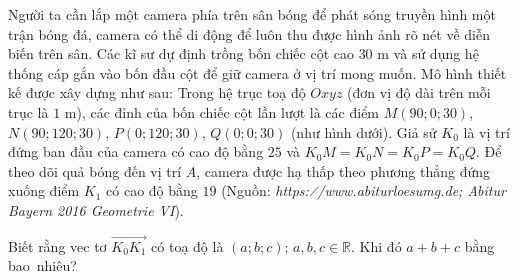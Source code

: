 \begin{bt}%
	Người ta cần lắp một camera phía trên sân bóng để phát sóng truyền hình một trận bóng đá, camera có thể di động để luôn thu được hình ảnh rõ nét về diễn biến trên sân. Các kĩ sư dự định trồng bốn chiếc cột cao $30$ m và sử dụng hệ thống cáp gắn vào bốn đầu cột để giữ camera ở vị trí mong muốn. Mô hình thiết kế được xây dựng như sau: Trong hệ trục toạ độ $Oxyz$ (đơn vị độ dài trên mỗi trục là $1$ m), các đỉnh của bốn chiếc cột lần lượt là các điểm $M\left(90; 0; 30 \right)$, $N\left(90; 120; 30 \right)$,  $P\left(0; 120; 30 \right)$, $Q\left(0; 0; 30 \right)$ (như hình dưới). Giả sử $K_0$ là vị trí đứng ban đầu của camera có cao độ bằng $25$ và $K_0M = K_0N = K_0P = K_0Q$. Để theo dõi quả bóng đến vị trí $A$, camera được hạ thấp theo phương thẳng đứng xuống điểm $K_1$ có cao độ bằng $19$ (Nguồn: \textit{https:⁄/www.abiturloesumg.de; Abitur Bayern 2016 Geometrie VI}).
	\begin{center}
	\end{center}
	Biết rằng vec tơ $\overrightarrow{K_0K_1}$ có toạ độ là $\left(a; b; c \right)$;  $a, b, c \in \mathbb{R}$. Khi đó $a + b + c$ bằng bao~nhiêu?
\end{bt}
